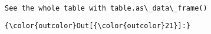 \documentclass[11pt]{article}
\begin{document}
    
    \begin{Verbatim}[commandchars=\\\{\}]

See the whole table with table.as\_data\_frame()

    \end{Verbatim}

\begin{Verbatim}[commandchars=\\\{\}]
{\color{outcolor}Out[{\color{outcolor}21}]:} 
\end{Verbatim}
            

    
    
    
    
\end{document}
